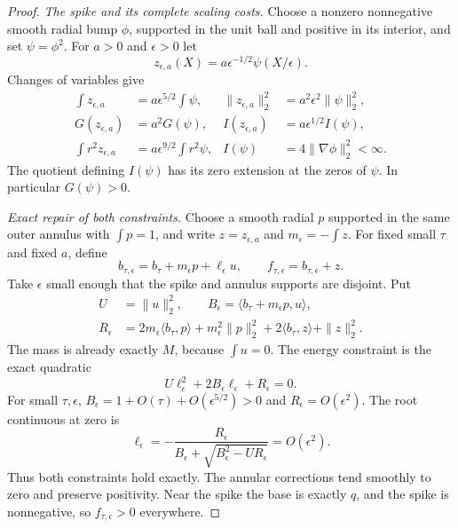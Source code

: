 \documentclass[11pt]{article}
\numberwithin{equation}{section}
\begin{document}
\begin{proof}
\emph{The spike and its complete scaling costs.}
Choose a nonzero nonnegative smooth radial bump $\phi$, supported in
the unit ball and positive in its interior, and set $\psi=\phi^2$.
For $a>0$ and $\epsilon>0$ let
\[
 z_{\epsilon,a}(X)=a\epsilon^{-1/2}\psi(X/\epsilon).
\]
Changes of variables give
\begin{align}
 \int z_{\epsilon,a}&=a\epsilon^{5/2}\int\psi,&
 \|z_{\epsilon,a}\|_2^2&=a^2\epsilon^2\|\psi\|_2^2,\nonumber\\
 G(z_{\epsilon,a})&=a^2G(\psi),&
 I(z_{\epsilon,a})&=a\epsilon^{1/2}I(\psi),
 \label{r14:spikescalings}\\
 \int r^2z_{\epsilon,a}&=a\epsilon^{9/2}\int r^2\psi,&
 I(\psi)&=4\|\nabla\phi\|_2^2<\infty.\nonumber
\end{align}
The quotient defining $I(\psi)$ has its zero extension at the zeros
of $\psi$. In particular $G(\psi)>0$.

\emph{Exact repair of both constraints.}
Choose a smooth radial $p$ supported in the same outer annulus with
$\int p=1$, and write $z=z_{\epsilon,a}$ and $m_\epsilon=-\int z$.
For fixed small $\tau$ and fixed $a$, define
\begin{equation}\label{r14:repairedprofile}
 b_{\tau,\epsilon}=b_\tau+m_\epsilon p+\ell_\epsilon u,
 \qquad f_{\tau,\epsilon}=b_{\tau,\epsilon}+z.
\end{equation}
Take $\epsilon$ small enough that the spike and annulus supports are
disjoint. Put
\begin{align*}
 U&=\|u\|_2^2,\qquad
 B_\epsilon=\langle b_\tau+m_\epsilon p,u\rangle,\\
 R_\epsilon&=2m_\epsilon\langle b_\tau,p\rangle
 +m_\epsilon^2\|p\|_2^2+2\langle b_\tau,z\rangle+\|z\|_2^2.
\end{align*}
The mass is already exactly $M$, because $\int u=0$. The energy
constraint is the exact quadratic
\[
 U\ell_\epsilon^2+2B_\epsilon\ell_\epsilon+R_\epsilon=0.
\]
For small $\tau,\epsilon$, $B_\epsilon=1+O(\tau)+O(\epsilon^{5/2})>0$
and $R_\epsilon=O(\epsilon^2)$. The root continuous at zero is
\begin{equation}\label{r14:repairroot}
 \ell_\epsilon=-\frac{R_\epsilon}
 {B_\epsilon+\sqrt{B_\epsilon^2-U R_\epsilon}}
 =O(\epsilon^2).
\end{equation}
Thus both constraints hold exactly. The annular corrections tend
smoothly to zero and preserve positivity. Near the spike the base is
exactly $q$, and the spike is nonnegative, so $f_{\tau,\epsilon}>0$
everywhere.


\end{proof}
\end{document}
